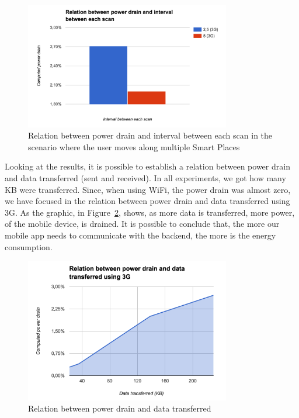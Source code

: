 \begin{figure}[!ht]
  \centering
    \includegraphics[width=0.8\textwidth, keepaspectratio]{images/results_battery_walking}
    \caption{Relation between power drain and interval between each scan in the scenario where the user moves along multiple Smart Places}
    \label{fig:results_battery_walking}
\end{figure}

Looking at the results, it is possible to establish a relation between power drain and data transferred (sent and received).
In all experiments, we got how many \gls{KB} were transferred.
Since, when using \gls{WiFi}, the power drain was almost zero, we have focused in the relation between power drain and data transferred using \gls{3G}.
As the graphic, in Figure~\ref{fig:results_battery_data}, shows, as more data is transferred, more power, of the mobile device, is drained.
It is possible to conclude that, the more our mobile app needs to communicate with the backend, the more is the energy consumption.

\begin{figure}[!ht]
  \centering
    \includegraphics[width=0.8\textwidth, keepaspectratio]{images/results_battery_data}
    \caption{Relation between power drain and data transferred}
    \label{fig:results_battery_data}
\end{figure}

